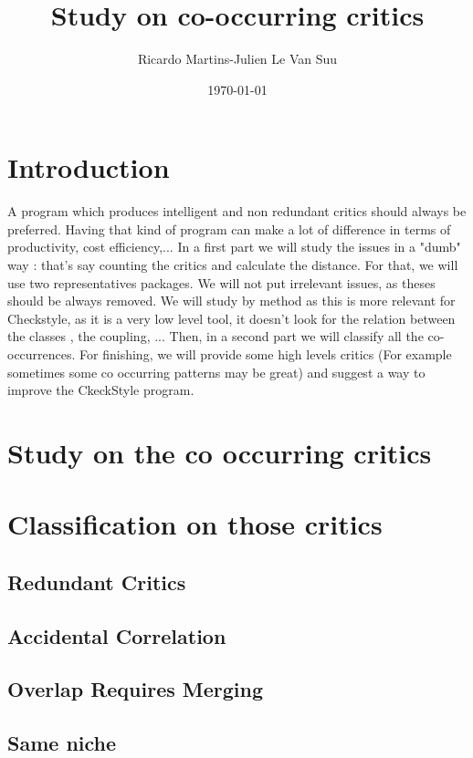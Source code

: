 \documentclass{article}
\begin{document}
\title{Study on co-occurring critics}
\author{Ricardo Martins-Julien Le Van Suu}
\date\today
\maketitle
\section{Introduction}
A program which produces intelligent and non redundant critics should always be preferred. Having that kind of program can make a lot of difference in terms of productivity, cost efficiency,... 
In a first part we will study the issues in a "dumb" way : that's say counting the critics and calculate the distance.
For that, we will use two representatives packages. We will not put irrelevant issues, as theses should be always removed. We will study by method as this is more relevant for Checkstyle, as it is a very low level tool, it doesn't look for the relation between the classes , the coupling, ...
Then, in a second part we will classify all the co-occurrences.
For finishing, we will provide some high levels critics (For example sometimes some co occurring patterns may be great) and suggest a way to improve the CkeckStyle program.

\section{Study on the co occurring critics}



\section{Classification on those critics}
\subsection{Redundant Critics}

\subsection{Accidental Correlation}

\subsection{Overlap Requires Merging}

\subsection{Same niche}
\end{document}
